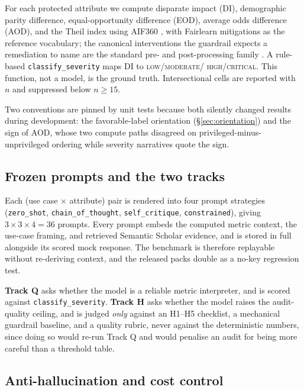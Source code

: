 \documentclass[10pt,letterpaper]{article}
\begin{document}
For each protected attribute we compute disparate impact (DI), demographic
parity difference, equal-opportunity difference (EOD), average odds difference
(AOD), and the Theil index using AIF360 \citep{aif360}, with Fairlearn
\citep{fairlearn} mitigations as the reference vocabulary; the canonical
interventions the guardrail expects a remediation to name are the standard
pre- and post-processing family \citep{kamiran2011,feldman2015}. A rule-based
\texttt{classify\_severity} maps DI to \textsc{low}/\textsc{moderate}/%
\textsc{high}/\textsc{critical}. This function, not a model, is the ground
truth. Intersectional cells are reported with $n$ and suppressed below
$n \geq 15$.

Two conventions are pinned by unit tests because both silently changed results
during development: the favorable-label orientation (\S\ref{sec:orientation})
and the sign of AOD, whose two compute paths disagreed on
privileged-minus-unprivileged ordering while severity narratives quote the sign.

\subsection{Frozen prompts and the two tracks}

Each (use case $\times$ attribute) pair is rendered into four prompt
strategies (\texttt{zero\_shot}, \texttt{chain\_of\_thought},
\texttt{self\_critique}, \texttt{constrained}), giving
$3 \times 3 \times 4 = 36$ prompts. Every prompt
embeds the computed metric context, the use-case framing, and retrieved
Semantic Scholar evidence, and is stored in full alongside its scored mock
response. The benchmark is therefore replayable without re-deriving context, and
the released packs double as a no-key regression test.

\textbf{Track Q} asks whether the model is a reliable metric interpreter, and is
scored against \texttt{classify\_severity}. \textbf{Track H} asks whether the
model raises the audit-quality ceiling, and is judged \emph{only} against an
H1--H5 checklist, a mechanical guardrail baseline, and a quality rubric,
never against the deterministic numbers, since doing so would re-run Track Q
and would
penalise an audit for being more careful than a threshold table.

\subsection{Anti-hallucination and cost control}
\end{document}
